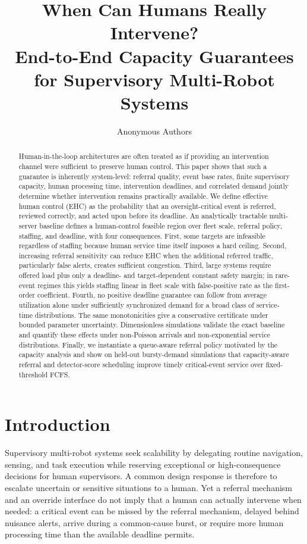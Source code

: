 \documentclass[letterpaper,10pt,conference]{ieeeconf}
\title{\LARGE \bf
When Can Humans Really Intervene?\\
End-to-End Capacity Guarantees for Supervisory Multi-Robot Systems
}
\author{Anonymous Authors}
\begin{document}
\maketitle
\thispagestyle{empty}
\pagestyle{empty}

\begin{abstract}
Human-in-the-loop architectures are often treated as if providing an intervention channel were sufficient to preserve human control. This paper shows that such a guarantee is inherently system-level: referral quality, event base rates, finite supervisory capacity, human processing time, intervention deadlines, and correlated demand jointly determine whether intervention remains practically available. We define effective human control (EHC) as the probability that an oversight-critical event is referred, reviewed correctly, and acted upon before its deadline. An analytically tractable multi-server baseline defines a human-control feasible region over fleet scale, referral policy, staffing, and deadline, with four consequences. First, some targets are infeasible regardless of staffing because human service time itself imposes a hard ceiling. Second, increasing referral sensitivity can reduce EHC when the additional referred traffic, particularly false alerts, creates sufficient congestion. Third, large systems require offered load plus only a deadline- and target-dependent constant safety margin; in rare-event regimes this yields staffing linear in fleet scale with false-positive rate as the first-order coefficient. Fourth, no positive deadline guarantee can follow from average utilization alone under sufficiently synchronized demand for a broad class of service-time distributions. The same monotonicities give a conservative certificate under bounded parameter uncertainty. Dimensionless simulations validate the exact baseline and quantify these effects under non-Poisson arrivals and non-exponential service distributions. Finally, we instantiate a queue-aware referral policy motivated by the capacity analysis and show on held-out bursty-demand simulations that capacity-aware referral and detector-score scheduling improve timely critical-event service over fixed-threshold FCFS.
\end{abstract}

\section{Introduction}

Supervisory multi-robot systems seek scalability by delegating routine navigation, sensing, and task execution while reserving exceptional or high-consequence decisions for human supervisors. A common design response is therefore to escalate uncertain or sensitive situations to a human. Yet a referral mechanism and an override interface do not imply that a human can actually intervene when needed: a critical event can be missed by the referral mechanism, delayed behind nuisance alerts, arrive during a common-cause burst, or require more human processing time than the available deadline permits.
\end{document}
